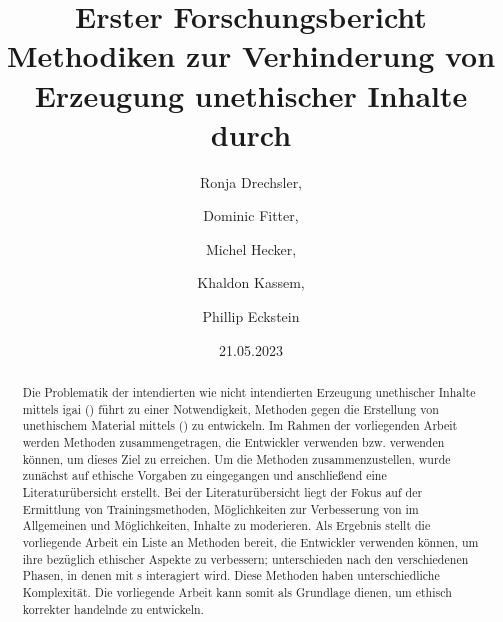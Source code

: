 \documentclass[hidelinks,12pt]{report}
\title{Erster Forschungsbericht \\[1ex] \large Methodiken zur Verhinderung von  Erzeugung unethischer Inhalte durch \GLSabrev{igai}}
\date{21.05.2023}
\author{Ronja Drechsler, \and Dominic Fitter, \and Michel Hecker, \and Khaldon Kassem, \and Phillip Eckstein}
\begin{document}
\maketitle

\begin{abstract}
	Die Problematik der intendierten wie nicht intendierten Erzeugung unethischer Inhalte mittels \Gls{igai} () führt zu einer Notwendigkeit, Methoden gegen die Erstellung von unethischem Material mittels () zu entwickeln.
	Im Rahmen der vorliegenden Arbeit werden Methoden zusammengetragen, die Entwickler verwenden bzw. verwenden können, um dieses Ziel zu erreichen. 
	Um die Methoden zusammenzustellen, wurde zunächst auf ethische Vorgaben zu  eingegangen und anschließend eine Literaturübersicht erstellt.
	Bei der Literaturübersicht liegt der Fokus auf der Ermittlung von Trainingsmethoden, Möglichkeiten zur Verbesserung von  im Allgemeinen und Möglichkeiten, Inhalte zu moderieren.
	Als Ergebnis stellt die vorliegende Arbeit ein Liste an Methoden bereit, die Entwickler verwenden können, um ihre  bezüglich ethischer Aspekte zu verbessern; unterschieden nach den verschiedenen Phasen, in denen mit s interagiert wird. Diese Methoden haben unterschiedliche Komplexität. 
	Die vorliegende Arbeit kann somit als Grundlage dienen, um ethisch korrekter handelnde  zu entwickeln.
\end{abstract}



\tableofcontents
\newpage
\printnoidxglossary
\newpage
\end{document}
